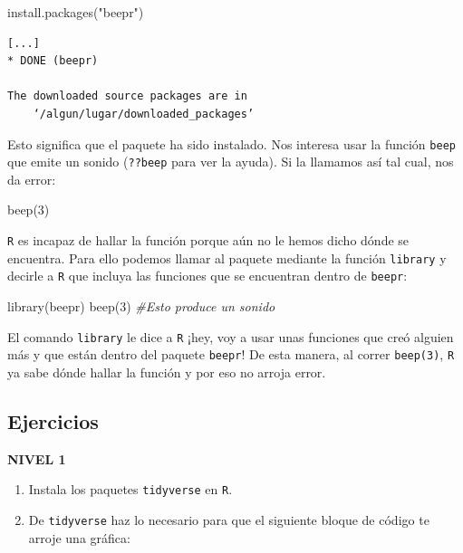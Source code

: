 \documentclass[]{tufte-book}
\newenvironment{Shaded}{}{}
\newcommand{\CommentTok}[1]{\textcolor[rgb]{0.38,0.63,0.69}{\textit{#1}}}
\newcommand{\DecValTok}[1]{\textcolor[rgb]{0.25,0.63,0.44}{#1}}
\newcommand{\FunctionTok}[1]{\textcolor[rgb]{0.02,0.16,0.49}{#1}}
\newcommand{\NormalTok}[1]{#1}
\newcommand{\StringTok}[1]{\textcolor[rgb]{0.25,0.44,0.63}{#1}}
\providecommand{\tightlist}{%
  \setlength{\itemsep}{0pt}\setlength{\parskip}{0pt}}
\begin{document}
\begin{Shaded}
\begin{Highlighting}[]
\FunctionTok{install.packages}\NormalTok{(}\StringTok{"beepr"}\NormalTok{)}
\end{Highlighting}
\end{Shaded}

\begin{verbatim}
[...]
* DONE (beepr)

The downloaded source packages are in
    ‘/algun/lugar/downloaded_packages’
\end{verbatim}

Esto significa que el paquete ha sido instalado. Nos interesa usar la
función \texttt{beep} que emite un sonido (\texttt{??beep} para ver la
ayuda). Si la llamamos así tal cual, nos da error:

\begin{Shaded}
\begin{Highlighting}[]
\FunctionTok{beep}\NormalTok{(}\DecValTok{3}\NormalTok{)}
\end{Highlighting}
\end{Shaded}

\texttt{R} es incapaz de hallar la función porque aún no le hemos dicho
dónde se encuentra. Para ello podemos llamar al paquete mediante la
función \texttt{library} y decirle a \texttt{R} que incluya las
funciones que se encuentran dentro de \texttt{beepr}:

\begin{Shaded}
\begin{Highlighting}[]
\FunctionTok{library}\NormalTok{(beepr)}
\FunctionTok{beep}\NormalTok{(}\DecValTok{3}\NormalTok{) }\CommentTok{\#Esto produce un sonido}
\end{Highlighting}
\end{Shaded}

El comando \texttt{library} le dice a \texttt{R} ¡hey, voy a usar unas
funciones que creó alguien más y que están dentro del paquete
\texttt{beepr}! De esta manera, al correr \texttt{beep(3)}, \texttt{R}
ya sabe dónde hallar la función y por eso no arroja error.

\hypertarget{ejercicios-1}{%
\subsection{Ejercicios}\label{ejercicios-1}}

\textbf{NIVEL 1}

\begin{enumerate}
\def\labelenumi{\arabic{enumi}.}
\tightlist
\item
  Instala los paquetes \texttt{tidyverse} en \texttt{R}.
\item
  De \texttt{tidyverse} haz lo necesario para que el siguiente bloque de
  código te arroje una gráfica:
\end{enumerate}
\end{document}
